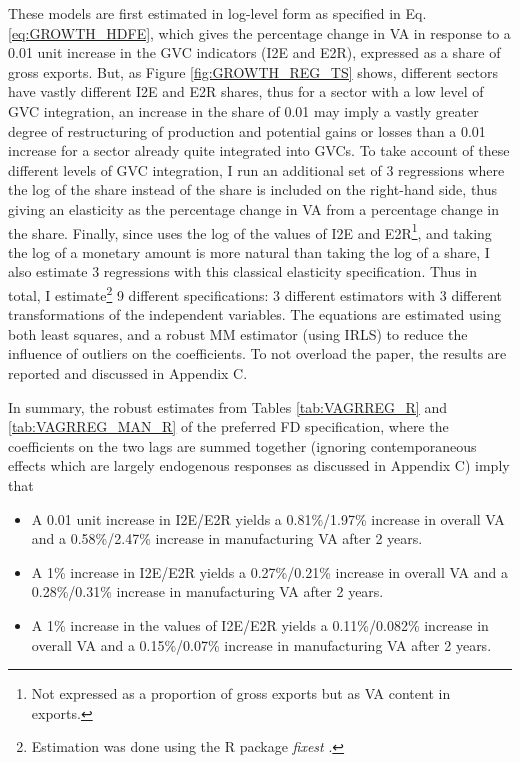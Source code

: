 \documentclass[a4paper]{article}
\begin{document}
These models are first estimated in log-level form as specified in Eq. \ref{eq:GROWTH_HDFE}, which gives the percentage change in VA in response to a 0.01 unit increase in the GVC indicators (I2E and E2R), expressed as a share of gross exports. But, as Figure \ref{fig:GROWTH_REG_TS} shows, different sectors have vastly different I2E and E2R shares, thus for a sector with a low level of GVC integration, an increase in the share of 0.01 may imply a vastly greater degree of restructuring of production and potential gains or losses than a 0.01 increase for a sector already quite integrated into GVCs. To take account of these different levels of GVC integration, I run an additional set of 3 regressions where the log of the share instead of the share is included on the right-hand side, thus giving an elasticity as the percentage change in VA from a percentage change in the share. Finally, since \citet{Kummritz20161} uses the log of the values of I2E and E2R\footnote{Not expressed as a proportion of gross exports but as VA content in exports.}, and taking the log of a monetary amount is more natural than taking the log of a share, I also estimate 3 regressions with this classical elasticity specification. Thus in total, I estimate\footnote{Estimation was done using the R package \textit{fixest} \citep{fixest2018}.} 9 different specifications: 3 different estimators with 3 different transformations of the independent variables. The equations are estimated using both least squares, and a robust MM estimator (using IRLS) to reduce the influence of outliers on the coefficients. To not overload the paper, the results are reported and discussed in Appendix C. \newline %


In summary, the robust estimates from Tables \ref{tab:VAGRREG_R} and \ref{tab:VAGRREG_MAN_R} of the preferred FD specification, where the coefficients on the two lags are summed together (ignoring contemporaneous effects which are largely endogenous responses as discussed in Appendix C) imply that

\begin{itemize}
\item A 0.01 unit increase in I2E/E2R yields a 0.81\%/1.97\% increase in overall VA and a 0.58\%/2.47\% increase in manufacturing VA after 2 years.
\item A 1\% increase in I2E/E2R yields a 0.27\%/0.21\% increase in overall VA and a 0.28\%/0.31\% increase in manufacturing VA after 2 years.
\item A 1\% increase in the values of I2E/E2R yields a 0.11\%/0.082\% increase in overall VA and a 0.15\%/0.07\% increase in manufacturing VA after 2 years.
\end{itemize}
\end{document}
